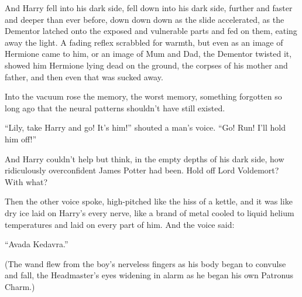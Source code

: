 And Harry fell into his dark side, fell down into his dark side, further and faster and deeper than ever before, down down down as the slide accelerated, as the Dementor latched onto the exposed and vulnerable parts and fed on them, eating away the light. A fading reflex scrabbled for warmth, but even as an image of Hermione came to him, or an image of Mum and Dad, the Dementor twisted it, showed him Hermione lying dead on the ground, the corpses of his mother and father, and then even that was sucked away.

Into the vacuum rose the memory, the worst memory, something forgotten so long ago that the neural patterns shouldn’t have still existed.

\begin{em}
“Lily, take Harry and go! It’s him!” shouted a man’s voice. “Go! Run! I’ll hold him off!”

And Harry couldn’t help but think, in the empty depths of his dark side, how ridiculously overconfident James Potter had been. Hold off Lord Voldemort? With what?

Then the other voice spoke, high-pitched like the hiss of a kettle, and it was like dry ice laid on Harry’s every nerve, like a brand of metal cooled to liquid helium temperatures and laid on every part of him. And the voice said:

“Avada Kedavra.”
\end{em}

(The wand flew from the boy’s nerveless fingers as his body began to convulse and fall, the Headmaster’s eyes widening in alarm as he began his own Patronus Charm.)

